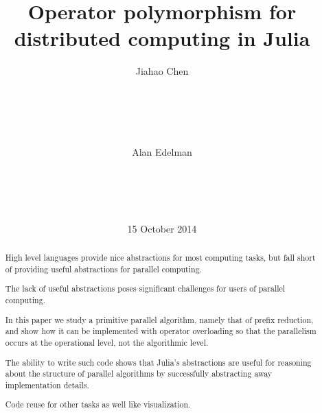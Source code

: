 \documentclass{sig-alternate}
\begin{document}
%

\title{Operator polymorphism for distributed computing in Julia}


\author{
%
%
\alignauthor
Jiahao Chen\\
       \\
       \\
       \\
       \\
       \\
\alignauthor
Alan Edelman\\
       \\
       \\
       \\
       \\
}

\date{15 October 2014}

\maketitle
\begin{abstract}
High level languages provide nice abstractions for most computing tasks, but fall short of providing useful abstractions for parallel computing.

The lack of useful abstractions poses significant challenges for users of parallel computing.

In this paper we study a primitive parallel algorithm, namely that of prefix reduction, and show how it can be implemented with operator overloading so that the parallelism occurs at the operational level, not the algorithmic level.

The ability to write such code shows that Julia's abstractions are useful for reasoning about the structure of parallel algorithms by successfully abstracting away implementation details.

Code reuse for other tasks as well like visualization.

\end{abstract}
\end{document}
